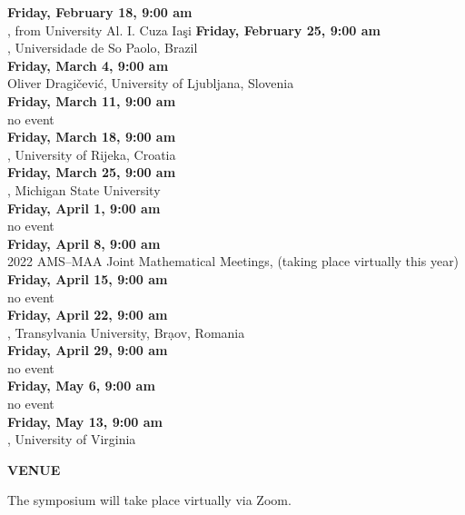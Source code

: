 \documentclass[a4paper]{article}
\begin{document}
\begin{minipage}{0.95\textwidth}
\begin{minipage}[b]{0.47\textwidth}
{\leavevmode \raggedright
\textbf{\color{cprimary} Friday, February 18, 9:00 am}\\ , from University Al. I. Cuza Ia\c{s}i
\textbf{\color{cprimary} Friday, February 25, 9:00 am}\\ , Universidade de So Paolo, Brazil\\
\textbf{\color{cprimary} Friday, March 4, 9:00 am}\\ Oliver Dragi\v{c}evi\'{c}, University of Ljubljana, Slovenia\\
\textbf{\color{cprimary} Friday, March 11, 9:00 am}\\ no event\\
\textbf{\color{cprimary} Friday, March 18, 9:00 am}\\ , University of Rijeka, Croatia\\
\textbf{\color{cprimary} Friday, March 25, 9:00 am}\\ , Michigan State University\\
\textbf{\color{cprimary} Friday, April 1, 9:00 am}\\ no event\\
\textbf{\color{cprimary} Friday, April 8, 9:00 am}\\ 2022 AMS--MAA Joint Mathematical Meetings, (taking place virtually this year)\\
\textbf{\color{cprimary} Friday, April 15, 9:00 am}\\ no event\\
\textbf{\color{cprimary} Friday, April 22, 9:00 am}\\ , Transylvania University, Br\d{a}ov, Romania\\
\textbf{\color{cprimary} Friday, April 29, 9:00 am}\\ no event\\
\textbf{\color{cprimary} Friday, May 6, 9:00 am}\\ no event\\
\textbf{\color{cprimary} Friday, May 13, 9:00 am}\\ , University of Virginia\\
\par{}
}

\vspace{0.1in}
\medskip

\large{\color{csecondary}\textbf{VENUE}}

The symposium will take place virtually via Zoom.


\end{minipage}
\end{minipage}
\end{document}
